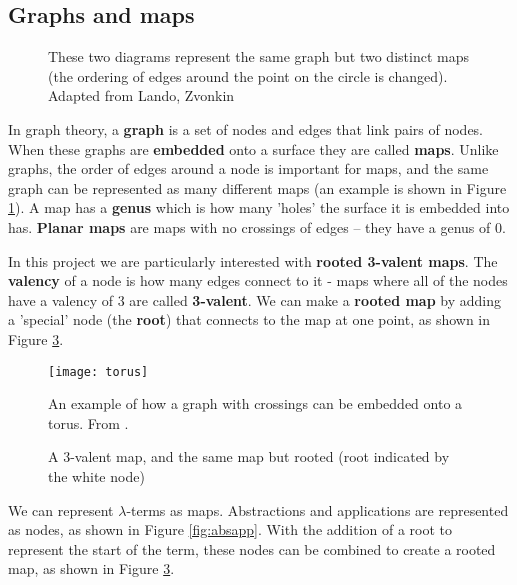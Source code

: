 \documentclass[11pt]{article}
\providecommand{\shortcite}[1]{\cite{#1}}
\begin{document}
\subsection{Graphs and maps}

\begin{figure}
    \centering
    
    \caption{These two diagrams represent the same graph but two distinct maps (the ordering of edges around the point on the circle is changed). Adapted from Lando, Zvonkin {\cite{graphs}}}
    \label{fig:maps}
\end{figure}

In graph theory, a \textbf{graph} is a set of nodes and edges that link pairs of nodes. When these graphs are \textbf{embedded} onto a surface they are called \textbf{maps}. Unlike graphs, the order of edges around a node is important for maps, and the same graph can be represented as many different maps (an example is shown in Figure \ref{fig:maps}). A map has a \textbf{genus} which is how many 'holes' the surface it is embedded into has. \textbf{Planar maps} are maps with no crossings of edges -- they have a genus of 0. 

In this project we are particularly interested with \textbf{rooted 3-valent maps}. The \textbf{valency} of a node is how many edges connect to it - maps where all of the nodes have a valency of 3 are called \textbf{3-valent}. We can make a \textbf{rooted map} by adding a 'special' node (the \textbf{root}) that connects to the map at one point, as shown in Figure \ref{fig:trivalentrooted}.

\begin{figure}
    \centering
    \texttt{[image: torus]}
    \caption{An example of how a graph with crossings can be embedded onto a torus. From \shortcite{zeil4ct}.}
    \label{fig:torus}
\end{figure}

\begin{figure}
    \centering
    
    \caption{A 3-valent map, and the same map but rooted (root indicated by the white node)}
    \label{fig:trivalentrooted}
\end{figure}

We can represent $\lambda$-terms as maps. Abstractions and applications are represented as nodes, as shown in Figure \ref{fig:absapp}. With the addition of a root to represent the start of the term, these nodes can be combined to create a rooted map, as shown in Figure \ref{fig:trivalentrooted}.
\end{document}
